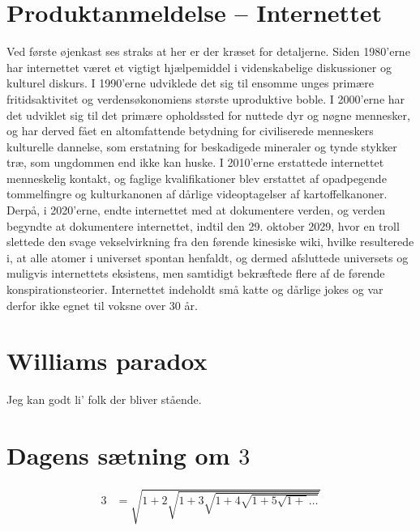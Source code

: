 

\begin{minipage}[b]{0.95\linewidth}
\begin{minipage}[t]{0.47\textwidth}
\vspace{3mm}
\section*{Produktanmeldelse -- Internettet}
Ved første øjenkast ses straks at her er der kræset for detaljerne. Siden 1980'erne har internettet været et vigtigt hjælpemiddel i videnskabelige diskussioner og kulturel diskurs. I 1990'erne udviklede det sig til ensomme unges primære fritidsaktivitet og verdensøkonomiens største uproduktive boble. I 2000'erne har det  udviklet sig til det primære opholdssted for nuttede dyr og nøgne mennesker, og har derved fået en altomfattende betydning for civiliserede menneskers kulturelle dannelse, som erstatning for beskadigede mineraler og tynde stykker træ, som ungdommen end ikke kan huske. I 2010'erne erstattede internettet menneskelig kontakt, og faglige kvalifikationer blev erstattet af opadpegende tommelfingre og kulturkanonen af dårlige videoptagelser af kartoffelkanoner. Derpå, i 2020'erne, endte internettet med at dokumentere verden, og verden begyndte at dokumentere internettet, indtil den 29. oktober 2029, hvor en troll slettede den svage vekselvirkning fra den førende kinesiske wiki, hvilke resulterede i, at alle atomer i universet spontan henfaldt, og dermed afsluttede universets og muligvis internettets eksistens, men samtidigt bekræftede flere af de førende konspirationsteorier. Internettet indeholdt små katte og dårlige jokes og var derfor ikke egnet til voksne over 30 år.

\vspace{1mm}
\section*{Williams paradox}
Jeg kan godt li' folk der bliver stående.

\vspace{1mm}
\section*{Dagens sætning om $3$}
\begin{align*}
3 &= \sqrt{1+2\sqrt{1+3\sqrt{1+4\sqrt{1+5\sqrt{1+}\dots}}}}
\end{align*}

\vspace{1mm}

\end{minipage}
\end{minipage}
